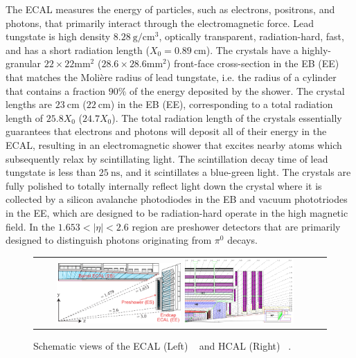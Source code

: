 The ECAL measures the energy of particles, such as electrons, positrons, and photons, that primarily interact through the electromagnetic force.
Lead tungstate is high density $\SI{8.28}{\g\per\cm\cubed}$, optically transparent, radiation-hard, fast, and has a short radiation length ($X_0 = \SI{0.89}{\cm}$).
The crystals have a highly-granular $22 \times 22 \si{\mm\squared}$ ($28.6 \times 28.6 \si{\mm\squared}$) front-face cross-section in the EB (EE) that matches the Molière radius of lead tungstate, i.e. the radius of a cylinder that contains a fraction $90 \%$ of the energy deposited by the shower.
The crystal lengths are $\SI{23}{\cm}$ ($\SI{22}{\cm}$) in the EB (EE), corresponding to a total radiation length of $25.8X_0$ ($24.7X_0$).
The total radiation length of the crystals essentially guarantees that electrons and photons will deposit all of their energy in the ECAL, resulting in an electromagnetic shower that excites nearby atoms which subsequently relax by scintillating light.
The scintillation decay time of lead tungstate is less than $\SI{25}{\ns}$, and it scintillates a blue-green light.
The crystals are fully polished to totally internally reflect light down the crystal where it is collected by a silicon avalanche photodiodes in the EB and vacuum phototriodes in the EE, which are designed to be radiation-hard operate in the high magnetic field.
In the $1.653 < \vert \eta \vert < 2.6$ region are preshower detectors that are primarily designed to distinguish photons originating from $\pi^0$ decays.

\begin{figure}[htb]
  \begin{center}
    \begin{tabular}{cc}
        \includegraphics[width=0.45\textwidth]{fig_LHC_CMS/ECAL.pdf}
        \includegraphics[width=0.40\textwidth]{fig_LHC_CMS/HCAL.png}
    \end{tabular}
    \caption{Schematic views of the ECAL (Left) ~\cite{Bayatian:922757} and HCAL (Right) ~\cite{Chatrchyan:1129810}.
            }
    \label{ECAL_HCAL}
  \end{center}
\end{figure}

